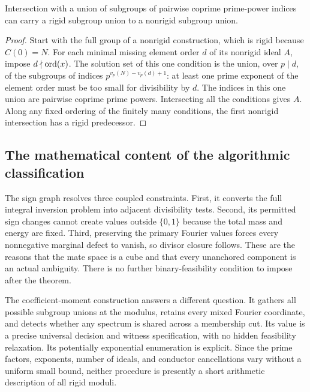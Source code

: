 \begin{corollary}
Intersection with a union of subgroups of pairwise coprime prime-power indices can carry a rigid subgroup union to a nonrigid subgroup union.
\end{corollary}
\begin{proof}
Start with the full group of a nonrigid construction, which is rigid because $C(0)=N$. For each minimal missing element order $d$ of its nonrigid ideal $A$, impose $d\nmid\operatorname{ord}(x)$. The solution set of this one condition is the union, over $p\mid d$, of the subgroups of indices $p^{v_p(N)-v_p(d)+1}$: at least one prime exponent of the element order must be too small for divisibility by $d$. The indices in this one union are pairwise coprime prime powers. Intersecting all the conditions gives $A$. Along any fixed ordering of the finitely many conditions, the first nonrigid intersection has a rigid predecessor.
\end{proof}

\subsection{The mathematical content of the algorithmic classification}
The sign graph resolves three coupled constraints. First, it converts the full integral inversion problem into adjacent divisibility tests. Second, its permitted sign changes cannot create values outside $\{0,1\}$ because the total mass and energy are fixed. Third, preserving the primary Fourier values forces every nonnegative marginal defect to vanish, so divisor closure follows. These are the reasons that the mate space is a cube and that every unanchored component is an actual ambiguity. There is no further binary-feasibility condition to impose after the theorem.

The coefficient-moment construction answers a different question. It gathers all possible subgroup unions at the modulus, retains every mixed Fourier coordinate, and detects whether any spectrum is shared across a membership cut. Its value is a precise universal decision and witness specification, with no hidden feasibility relaxation. Its potentially exponential enumeration is explicit. Since the prime factors, exponents, number of ideals, and conductor cancellations vary without a uniform small bound, neither procedure is presently a short arithmetic description of all rigid moduli.

